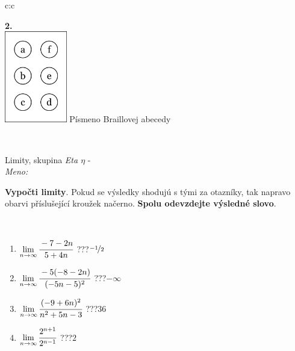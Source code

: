 \documentclass[10pt]{report}
\begin{document}
\begin{tabular}{c:c}
\begin{minipage}[c][104.5mm][t]{0.5\linewidth}
\begin{center}
\begin{minipage}{0.20\linewidth}
\begin{center}
{\Huge\bfseries 2.} \\[2mm]
\includegraphics[height=40mm]{../images/braille.png}
{\small Písmeno Braillovej abecedy}
\end{center}
\end{minipage}
\end{center}
\end{minipage}
\\ \hdashline
\begin{minipage}[c][104.5mm][t]{0.5\linewidth}
\begin{center}
\vspace{7mm}
{\huge Limity, skupina \textit{Eta $\eta$} -}\\[5mm]
\textit{Meno:}\phantom{xxxxxxxxxxxxxxxxxxxxxxxxxxxxxxxxxxxxxxxxxxxxxxxxxxxxxxxxxxxxxxxxx}\\[5mm]
\begin{minipage}{0.95\linewidth}
\begin{center}
\textbf{Vypočti limity}. Pokud se výsledky shodujú s tými za otazníky, tak napravo\\obarvi příslušející kroužek načerno. \textbf{Spolu odevzdejte výsledné slovo}.
\end{center}
\end{minipage}
\\[1mm]
\begin{minipage}{0.79\linewidth}
\begin{center}
\begin{varwidth}{\linewidth}
\begin{enumerate}
\normalsize
\item $\lim\limits_{n\to\infty}\cfrac{-7-2n}{5+4n}$\quad \dotfill\; ???\;\dotfill \quad $\nicefrac{-1}{2}$
\item $\lim\limits_{n\to\infty}\cfrac{-5(-8-2n)}{(-5n-5)^2}$\quad \dotfill\; ???\;\dotfill \quad $-\infty$
\item $\lim\limits_{n\to\infty}\cfrac{(-9+6n)^2}{n^2+5n-3}$\quad \dotfill\; ???\;\dotfill \quad $36$
\item $\lim\limits_{n\to\infty}\cfrac{2^{n+1}}{2^{n-1}}$\quad \dotfill\; ???\;\dotfill \quad $2$

\end{enumerate}
\end{varwidth}
\end{center}
\end{minipage}
\end{center}
\end{minipage}
\end{tabular}
\end{document}
